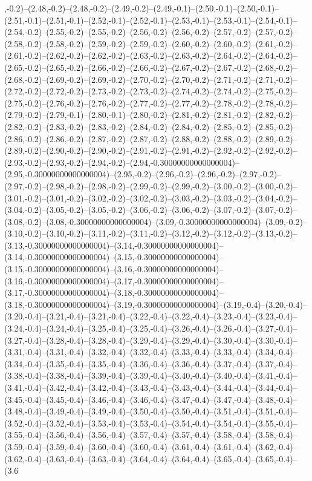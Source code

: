 ,-0.2)--(2.48,-0.2)--(2.48,-0.2)--(2.49,-0.2)--(2.49,-0.1)--(2.50,-0.1)--(2.50,-0.1)--(2.51,-0.1)--(2.51,-0.1)--(2.52,-0.1)--(2.52,-0.1)--(2.53,-0.1)--(2.53,-0.1)--(2.54,-0.1)--(2.54,-0.2)--(2.55,-0.2)--(2.55,-0.2)--(2.56,-0.2)--(2.56,-0.2)--(2.57,-0.2)--(2.57,-0.2)--(2.58,-0.2)--(2.58,-0.2)--(2.59,-0.2)--(2.59,-0.2)--(2.60,-0.2)--(2.60,-0.2)--(2.61,-0.2)--(2.61,-0.2)--(2.62,-0.2)--(2.62,-0.2)--(2.63,-0.2)--(2.63,-0.2)--(2.64,-0.2)--(2.64,-0.2)--(2.65,-0.2)--(2.65,-0.2)--(2.66,-0.2)--(2.66,-0.2)--(2.67,-0.2)--(2.67,-0.2)--(2.68,-0.2)--(2.68,-0.2)--(2.69,-0.2)--(2.69,-0.2)--(2.70,-0.2)--(2.70,-0.2)--(2.71,-0.2)--(2.71,-0.2)--(2.72,-0.2)--(2.72,-0.2)--(2.73,-0.2)--(2.73,-0.2)--(2.74,-0.2)--(2.74,-0.2)--(2.75,-0.2)--(2.75,-0.2)--(2.76,-0.2)--(2.76,-0.2)--(2.77,-0.2)--(2.77,-0.2)--(2.78,-0.2)--(2.78,-0.2)--(2.79,-0.2)--(2.79,-0.1)--(2.80,-0.1)--(2.80,-0.2)--(2.81,-0.2)--(2.81,-0.2)--(2.82,-0.2)--(2.82,-0.2)--(2.83,-0.2)--(2.83,-0.2)--(2.84,-0.2)--(2.84,-0.2)--(2.85,-0.2)--(2.85,-0.2)--(2.86,-0.2)--(2.86,-0.2)--(2.87,-0.2)--(2.87,-0.2)--(2.88,-0.2)--(2.88,-0.2)--(2.89,-0.2)--(2.89,-0.2)--(2.90,-0.2)--(2.90,-0.2)--(2.91,-0.2)--(2.91,-0.2)--(2.92,-0.2)--(2.92,-0.2)--(2.93,-0.2)--(2.93,-0.2)--(2.94,-0.2)--(2.94,-0.30000000000000004)--(2.95,-0.30000000000000004)--(2.95,-0.2)--(2.96,-0.2)--(2.96,-0.2)--(2.97,-0.2)--(2.97,-0.2)--(2.98,-0.2)--(2.98,-0.2)--(2.99,-0.2)--(2.99,-0.2)--(3.00,-0.2)--(3.00,-0.2)--(3.01,-0.2)--(3.01,-0.2)--(3.02,-0.2)--(3.02,-0.2)--(3.03,-0.2)--(3.03,-0.2)--(3.04,-0.2)--(3.04,-0.2)--(3.05,-0.2)--(3.05,-0.2)--(3.06,-0.2)--(3.06,-0.2)--(3.07,-0.2)--(3.07,-0.2)--(3.08,-0.2)--(3.08,-0.30000000000000004)--(3.09,-0.30000000000000004)--(3.09,-0.2)--(3.10,-0.2)--(3.10,-0.2)--(3.11,-0.2)--(3.11,-0.2)--(3.12,-0.2)--(3.12,-0.2)--(3.13,-0.2)--(3.13,-0.30000000000000004)--(3.14,-0.30000000000000004)--(3.14,-0.30000000000000004)--(3.15,-0.30000000000000004)--(3.15,-0.30000000000000004)--(3.16,-0.30000000000000004)--(3.16,-0.30000000000000004)--(3.17,-0.30000000000000004)--(3.17,-0.30000000000000004)--(3.18,-0.30000000000000004)--(3.18,-0.30000000000000004)--(3.19,-0.30000000000000004)--(3.19,-0.4)--(3.20,-0.4)--(3.20,-0.4)--(3.21,-0.4)--(3.21,-0.4)--(3.22,-0.4)--(3.22,-0.4)--(3.23,-0.4)--(3.23,-0.4)--(3.24,-0.4)--(3.24,-0.4)--(3.25,-0.4)--(3.25,-0.4)--(3.26,-0.4)--(3.26,-0.4)--(3.27,-0.4)--(3.27,-0.4)--(3.28,-0.4)--(3.28,-0.4)--(3.29,-0.4)--(3.29,-0.4)--(3.30,-0.4)--(3.30,-0.4)--(3.31,-0.4)--(3.31,-0.4)--(3.32,-0.4)--(3.32,-0.4)--(3.33,-0.4)--(3.33,-0.4)--(3.34,-0.4)--(3.34,-0.4)--(3.35,-0.4)--(3.35,-0.4)--(3.36,-0.4)--(3.36,-0.4)--(3.37,-0.4)--(3.37,-0.4)--(3.38,-0.4)--(3.38,-0.4)--(3.39,-0.4)--(3.39,-0.4)--(3.40,-0.4)--(3.40,-0.4)--(3.41,-0.4)--(3.41,-0.4)--(3.42,-0.4)--(3.42,-0.4)--(3.43,-0.4)--(3.43,-0.4)--(3.44,-0.4)--(3.44,-0.4)--(3.45,-0.4)--(3.45,-0.4)--(3.46,-0.4)--(3.46,-0.4)--(3.47,-0.4)--(3.47,-0.4)--(3.48,-0.4)--(3.48,-0.4)--(3.49,-0.4)--(3.49,-0.4)--(3.50,-0.4)--(3.50,-0.4)--(3.51,-0.4)--(3.51,-0.4)--(3.52,-0.4)--(3.52,-0.4)--(3.53,-0.4)--(3.53,-0.4)--(3.54,-0.4)--(3.54,-0.4)--(3.55,-0.4)--(3.55,-0.4)--(3.56,-0.4)--(3.56,-0.4)--(3.57,-0.4)--(3.57,-0.4)--(3.58,-0.4)--(3.58,-0.4)--(3.59,-0.4)--(3.59,-0.4)--(3.60,-0.4)--(3.60,-0.4)--(3.61,-0.4)--(3.61,-0.4)--(3.62,-0.4)--(3.62,-0.4)--(3.63,-0.4)--(3.63,-0.4)--(3.64,-0.4)--(3.64,-0.4)--(3.65,-0.4)--(3.65,-0.4)--(3.6